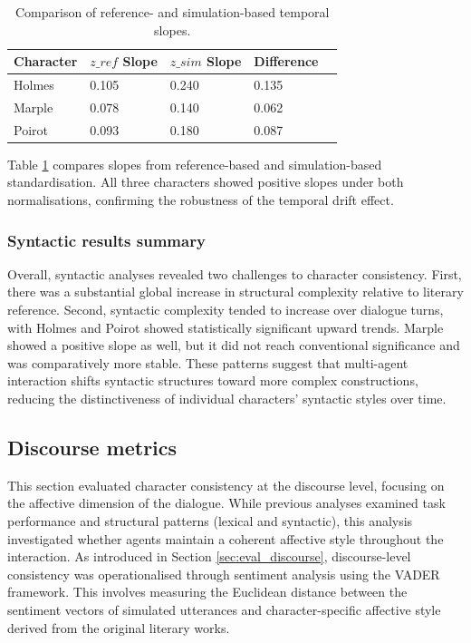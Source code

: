 \documentclass{article}
\begin{document}
\begin{table}[H]
\centering
\begin{tabular}{l l l l l}\toprule
Character & $z\_{ref}$ Slope& $z\_{sim}$ Slope & Difference \\\midrule
Holmes & 0.105 & 0.240 & 0.135 \\
Marple & 0.078 & 0.140 & 0.062 \\
Poirot & 0.093 & 0.180 & 0.087 \\ \bottomrule
\end{tabular}
\caption{Comparison of reference- and simulation-based temporal slopes.}
\label{tab:syntax_slope_compare}
\end{table}

Table \ref{tab:syntax_slope_compare} compares slopes from reference-based and simulation-based standardisation. All three characters showed positive slopes under both normalisations, confirming the robustness of the temporal drift effect.


\subsubsection{Syntactic results summary}

Overall, syntactic analyses revealed two challenges to character consistency. First, there was a substantial global increase in structural complexity relative to literary reference. Second, syntactic complexity tended to increase over dialogue turns, with Holmes and Poirot showed statistically significant upward trends. Marple showed a positive slope as well, but it did not reach conventional significance and was comparatively more stable. These patterns suggest that multi-agent interaction shifts syntactic structures toward more complex constructions, reducing the distinctiveness of individual characters' syntactic styles over time. 


\subsection{Discourse metrics} \label{sec:results_discourse}

This section evaluated character consistency at the discourse level, focusing on the affective dimension of the dialogue. While previous analyses examined task performance and structural patterns (lexical and syntactic), this analysis investigated whether agents maintain a coherent affective style throughout the interaction. As introduced in Section \ref{sec:eval_discourse}, discourse-level consistency was operationalised through sentiment analysis using the VADER framework. This involves measuring the Euclidean distance between the sentiment vectors of simulated utterances and character-specific affective style derived from the original literary works.
\end{document}
